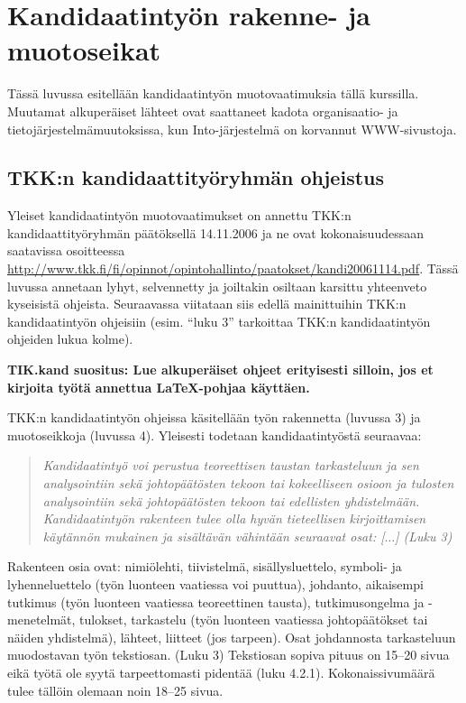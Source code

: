
\section{Kandidaatintyön rakenne- ja muotoseikat}
\label{sec:esimluku}

Tässä luvussa esitellään kandidaatintyön muotovaatimuksia
tällä kurssilla. Muutamat alkuperäiset lähteet ovat saattaneet
kadota organisaatio- ja tietojärjestelmämuutoksissa, kun
Into-järjestelmä on korvannut WWW-sivustoja.

\subsection{TKK:n kandidaattityöryhmän ohjeistus}

Yleiset kandidaatintyön muotovaatimukset on annettu TKK:n
kandidaattityöryhmän päätöksellä 14.11.2006 ja ne ovat
kokonaisuudessaan saatavissa osoitteessa
\url{http://www.tkk.fi/fi/opinnot/opintohallinto/paatokset/kandi20061114.pdf}.
Tässä luvussa annetaan lyhyt, selvennetty ja joiltakin osiltaan
karsittu yhteenveto kyseisistä ohjeista. Seuraavassa viitataan siis
edellä mainittuihin TKK:n kandidaatintyön ohjeisiin (esim. ``luku 3''
tarkoittaa TKK:n kandidaatintyön ohjeiden lukua kolme).

\textbf{TIK.kand suositus: Lue alkuperäiset ohjeet erityisesti
  silloin, jos et kirjoita työtä annettua \LaTeX{}-pohjaa käyttäen.}

TKK:n kandidaatintyön ohjeissa käsitellään työn rakennetta (luvussa 3)
ja muotoseikkoja (luvussa 4). Yleisesti todetaan kandidaatintyöstä
seuraavaa:
%
\begin{quotation}
\noindent \it
Kandidaatintyö voi perustua teoreettisen taustan tarkasteluun 
ja sen analysointiin sekä johtopäätösten tekoon tai kokeelliseen osioon ja 
tulosten analysointiin sekä johtopäätösten tekoon
tai edellisten yhdistelmään.
Kandidaatintyön rakenteen tulee olla hyvän tieteellisen kirjoittamisen 
käytännön mukainen
ja sisältävän vähintään seuraavat osat: [$\ldots$] (Luku 3)
\end{quotation}

Rakenteen osia ovat: nimiölehti, tiivistelmä, sisällysluettelo,
symboli- ja lyhenneluettelo (työn luonteen vaatiessa voi puuttua),
johdanto, aikaisempi tutkimus (työn luonteen vaatiessa teoreettinen
tausta), tutkimusongelma ja -menetelmät, tulokset, tarkastelu (työn
luonteen vaatiessa johtopäätökset tai näiden yhdistelmä), lähteet,
liitteet (jos tarpeen). Osat johdannosta tarkasteluun muodostavan työn
tekstiosan. (Luku 3) Tekstiosan sopiva pituus on 15--20 sivua eikä
työtä ole syytä tarpeettomasti pidentää (luku 4.2.1).
Kokonaissivumäärä tulee tällöin olemaan noin 18--25 sivua.

